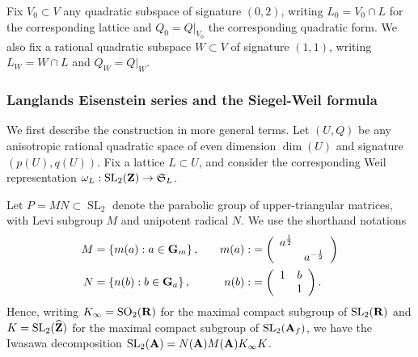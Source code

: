 \documentclass{amsart}
\theoremstyle{definition}
\theoremstyle{definition}
\theoremstyle{definition}
\begin{document}
Fix $V_0 \subset V$ any quadratic subspace of signature $(0,2)$, writing $L_0 = V_0 \cap L$ for the corresponding lattice
and $Q_0 = Q\vert_{V_0}$ the corresponding quadratic form. We also fix a rational quadratic subspace $W \subset V$ of 
signature $(1,1)$, writing $L_W = W \cap L$ and $Q_W = Q\vert_{W}$.

\subsubsection{Langlands Eisenstein series and the Siegel-Weil formula}

We first describe the construction in more general terms. 
Let $(U, Q)$ be any anisotropic rational quadratic space of even dimension $\dim(U)$ and signature $(p(U), q(U))$.
Fix a lattice $L \subset U$, and consider the corresponding Weil representation 
$\omega_{L}: \operatorname{SL}_2({\bf{Z}}) \rightarrow \mathfrak{S}_{L}$.

Let $P = MN \subset \operatorname{SL}_2$ denote the parabolic group of upper-triangular matrices, 
with Levi subgroup $M$ and unipotent radical $N$. We use the shorthand notations
\begin{align*}\begin{aligned} 
M &= \left\lbrace m(a) : a \in {\bf{G}}_m \right\rbrace, &\quad m(a): &= \left( \begin{array}{cc} a^{\frac{1}{2}} & ~\\ ~& a^{-\frac{1}{2}}\end{array} \right) \\
N &= \left\lbrace n(b) : b \in {\bf{G}}_a \right\rbrace, &\quad n(b): &= \left( \begin{array}{cc} 1 & b \\ ~& 1 \end{array} \right). \end{aligned}\end{align*}
Hence, writing $K_{\infty} = \operatorname{SO}_2({\bf{R}})$ for the maximal compact subgroup of $\operatorname{SL}_2({\bf{R}})$
and $K = \operatorname{SL}_2(\widehat{\bf{Z}})$ for the maximal compact subgroup of $\operatorname{SL}_2({\bf{A}}_f)$, 
we have the Iwasawa decomposition $\operatorname{SL}_2({\bf{A}}) = N({\bf{A}}) M({\bf{A}}) K_{\infty} K$.
\end{document}
